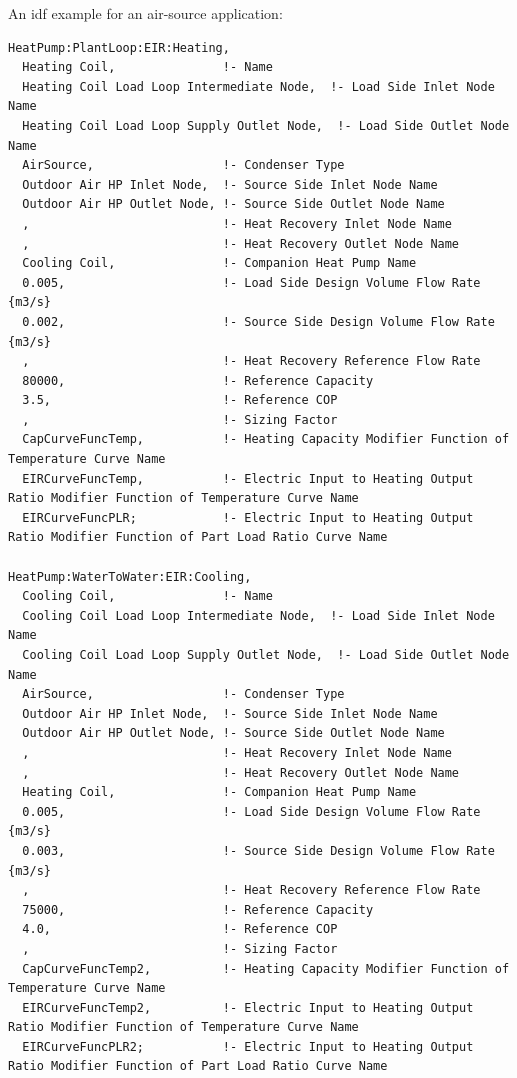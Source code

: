 An idf example for an air-source application:

\begin{lstlisting}
HeatPump:PlantLoop:EIR:Heating,
  Heating Coil,               !- Name
  Heating Coil Load Loop Intermediate Node,  !- Load Side Inlet Node Name
  Heating Coil Load Loop Supply Outlet Node,  !- Load Side Outlet Node Name
  AirSource,                  !- Condenser Type
  Outdoor Air HP Inlet Node,  !- Source Side Inlet Node Name
  Outdoor Air HP Outlet Node, !- Source Side Outlet Node Name
  ,                           !- Heat Recovery Inlet Node Name
  ,                           !- Heat Recovery Outlet Node Name
  Cooling Coil,               !- Companion Heat Pump Name
  0.005,                      !- Load Side Design Volume Flow Rate {m3/s}
  0.002,                      !- Source Side Design Volume Flow Rate {m3/s}
  ,                           !- Heat Recovery Reference Flow Rate
  80000,                      !- Reference Capacity
  3.5,                        !- Reference COP
  ,                           !- Sizing Factor
  CapCurveFuncTemp,           !- Heating Capacity Modifier Function of Temperature Curve Name
  EIRCurveFuncTemp,           !- Electric Input to Heating Output Ratio Modifier Function of Temperature Curve Name
  EIRCurveFuncPLR;            !- Electric Input to Heating Output Ratio Modifier Function of Part Load Ratio Curve Name

HeatPump:WaterToWater:EIR:Cooling,
  Cooling Coil,               !- Name
  Cooling Coil Load Loop Intermediate Node,  !- Load Side Inlet Node Name
  Cooling Coil Load Loop Supply Outlet Node,  !- Load Side Outlet Node Name
  AirSource,                  !- Condenser Type
  Outdoor Air HP Inlet Node,  !- Source Side Inlet Node Name
  Outdoor Air HP Outlet Node, !- Source Side Outlet Node Name
  ,                           !- Heat Recovery Inlet Node Name
  ,                           !- Heat Recovery Outlet Node Name
  Heating Coil,               !- Companion Heat Pump Name
  0.005,                      !- Load Side Design Volume Flow Rate {m3/s}
  0.003,                      !- Source Side Design Volume Flow Rate {m3/s}
  ,                           !- Heat Recovery Reference Flow Rate
  75000,                      !- Reference Capacity
  4.0,                        !- Reference COP
  ,                           !- Sizing Factor
  CapCurveFuncTemp2,          !- Heating Capacity Modifier Function of Temperature Curve Name
  EIRCurveFuncTemp2,          !- Electric Input to Heating Output Ratio Modifier Function of Temperature Curve Name
  EIRCurveFuncPLR2;           !- Electric Input to Heating Output Ratio Modifier Function of Part Load Ratio Curve Name
\end{lstlisting}

